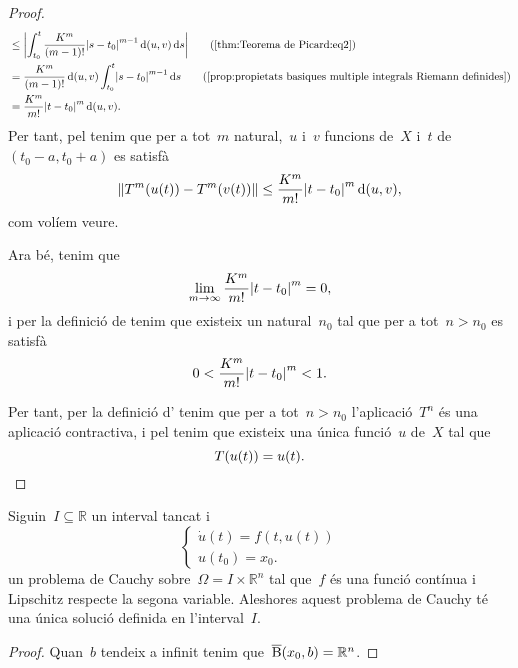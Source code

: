 \documentclass[../../Main.tex]{subfiles}
\begin{document}
\begin{theorem}
\begin{proof}
\begin{align*}
				&\leq\abs{\int_{t_{0}}^{t}\frac{K^{m}}{(m-1)!}\abs{s-t_{0}}^{m-1}\distancia(u,v)\diff s}\tag{\ref{thm:Teorema de Picard:eq2}}\\
				&=\frac{K^{m}}{(m-1)!}\distancia(u,v)\int_{t_{0}}^{t}\abs{s-t_{0}}^{m-1}\diff s\tag{\ref{prop:propietats basiques multiple integrals Riemann definides}}\\
				&=\frac{K^{m}}{m!}\abs{t-t_{0}}^{m}\distancia(u,v).%
			\end{align*}
			Per tant, pel  tenim que per a tot~\(m\) natural,~\(u\) i~\(v\) funcions de~\(X\) i~\(t\) de~\((t_{0}-a,t_{0}+a)\) es satisfà
			\[
			    \norm{T^{m}(u(t))-T^{m}(v(t))}\leq\frac{K^{m}}{m!}\abs{t-t_{0}}^{m}\distancia(u,v),
			\]
			com volíem veure.

			Ara bé, tenim que
			\[
			    \lim_{m\to\infty}\frac{K^{m}}{m!}\abs{t-t_{0}}^{m}=0,
			\]%
			i per la definició de  tenim que existeix un natural~\(n_{0}\) tal que per a tot~\(n>n_{0}\) es satisfà
			\[
			    0<{\frac{K^{m}}{m!}\abs{t-t_{0}}^{m}}<1.
			\]

			Per tant, per la definició d' tenim que per a tot~\(n>n_{0}\) l'aplicació~\(T^{n}\) és una aplicació contractiva, i pel \corollari{}  tenim que existeix una única funció~\(u\) de~\(X\) tal que
			\[
			    T(u(t))=u(t).\qedhere
			\]
		\end{proof}
	\end{theorem}
	\begin{corollary}
		\label{cor:Teorema de Picard}
		Siguin~\(I\subseteq\mathbb{R}\) un interval tancat i
		\[\begin{cases}
			\displaystyle \dot{u}(t)=f(t,u(t)) \\
			\displaystyle u(t_{0})=x_{0}.
		\end{cases}\]
		un problema de Cauchy sobre~\(\Omega=I\times\mathbb{R}^{n}\) tal que~\(f\) és una funció contínua i Lipschitz respecte la segona variable.
		Aleshores aquest problema de Cauchy té una única solució definida en l'interval~\(I\).
		\begin{proof}
			Quan~\(b\) tendeix a infinit tenim que~\(\overline{\operatorname{B}}(x_{0},b)=\mathbb{R}^{n}\).
		\end{proof}
	\end{corollary}
\end{document}
